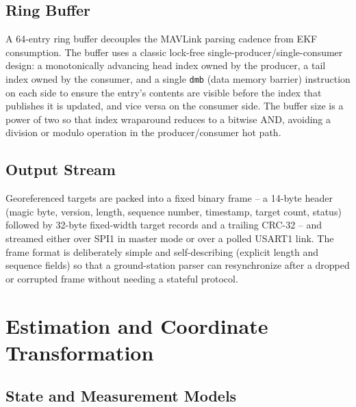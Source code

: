 \documentclass[conference]{IEEEtran}
\begin{document}
\subsection{Ring Buffer}

A 64-entry ring buffer decouples the MAVLink parsing cadence from EKF consumption. The buffer uses a classic lock-free single-producer/single-consumer design: a monotonically advancing head index owned by the producer, a tail index owned by the consumer, and a single \texttt{dmb} (data memory barrier) instruction on each side to ensure the entry's contents are visible before the index that publishes it is updated, and vice versa on the consumer side. The buffer size is a power of two so that index wraparound reduces to a bitwise AND, avoiding a division or modulo operation in the producer/consumer hot path.

\subsection{Output Stream}

Georeferenced targets are packed into a fixed binary frame -- a 14-byte header (magic byte, version, length, sequence number, timestamp, target count, status) followed by 32-byte fixed-width target records and a trailing CRC-32 -- and streamed either over SPI1 in master mode or over a polled USART1 link. The frame format is deliberately simple and self-describing (explicit length and sequence fields) so that a ground-station parser can resynchronize after a dropped or corrupted frame without needing a stateful protocol.

\section{Estimation and Coordinate Transformation}

\subsection{State and Measurement Models}
\end{document}
